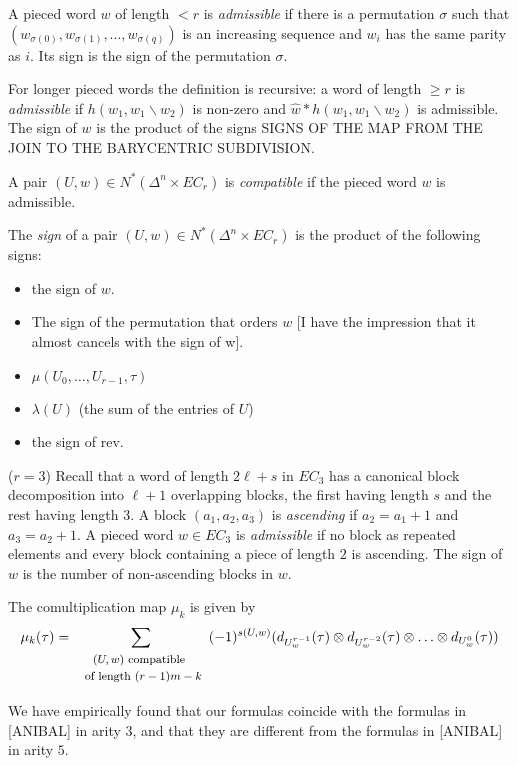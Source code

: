 \begin{definition} A pieced word $w$ of length $<r$ is \emph{admissible} if there is a permutation $\sigma$ such that $(w_{\sigma(0)},w_{\sigma(1)},\ldots,w_{\sigma(q)})$ is an increasing sequence and $w_{i}$ has the same parity as $i$. Its sign is the sign of the permutation $\sigma$.

For longer pieced words the definition is recursive: a word of length $\geq r$ is \emph{admissible} if $h(w_1,w_1\smallsetminus w_2)$ is non-zero and $\hat{w}*h(w_1,w_1\smallsetminus w_2)$ is admissible. The sign of $w$ is the product of the signs SIGNS OF THE MAP FROM THE JOIN TO THE BARYCENTRIC SUBDIVISION.
\end{definition}
\begin{definition}
    A pair $(U,w)\in N^*(\Delta^n\times EC_r)$ is \emph{compatible} if the pieced word $w$ is admissible.
\end{definition}
\begin{definition}
    The \emph{sign} of a pair $(U,w)\in N^*(\Delta^n\times EC_r)$ is the product of the following signs:
    \begin{itemize}
    \item the sign of $w$.
    \item The sign of the permutation that orders $w$ [I have the impression that it almost cancels with the sign of w].
    \item $\mu(U_0,\ldots,U_{r-1},\tau)$
    \item $\lambda(U)$ (the sum of the entries of $U$)
    \item the sign of $\mathrm{rev}$.
\end{itemize}
\end{definition}
\begin{example}
    ($r=3$) Recall that a word of length $2\ell+s$ in $EC_3$ has a canonical block decomposition into $\ell+1$ overlapping blocks, the first having length $s$ and the rest having length $3$. A block $(a_1,a_2,a_3)$ is \emph{ascending} if $a_2=a_1+1$ and $a_3=a_2+1$. A pieced word $w\in EC_3$ is \emph{admissible} if no block as repeated elements and every block containing a piece of length $2$ is ascending. The sign of $w$ is the number of non-ascending blocks in $w$.
\end{example}
The comultiplication map $\mu_k$ is given by
\[\mu_k(\tau) = \sum_{\begin{array}{c}\text{\footnotesize $(U,w)$ compatible }\\ \text{ \footnotesize of length $(r-1)m-k$}\end{array}} (-1)^{s(U,w)}(d_{U^{r-1}_{w}}(\tau)\otimes d_{U^{r-2}_{w}}(\tau)\otimes \ldots \otimes d_{U^{0}_{w}}(\tau) )\]

We have empirically found that our formulas coincide with the formulas in [ANIBAL] in arity $3$, and that they are different from the formulas in [ANIBAL] in arity $5$.
